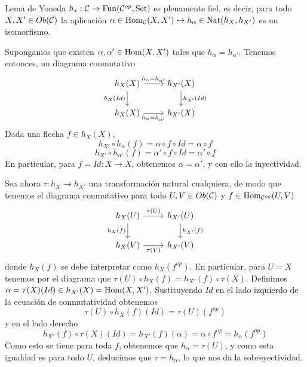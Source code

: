 \documentclass[twoside]{article}
\begin{document}
%
%
\begin{ejercicio}{Lema de Yoneda}
$h_*:{\mathcal C}\to \mathrm{Fun}({\mathcal C}^{op}, \mathrm{Set})$ es plenamente fiel, es decir, para todo $X,X'\in Ob({\mathcal C})$ la aplicación $\alpha\in\operatorname{Hom}_{{\mathcal C}}(X,X')\mapsto h_{\alpha}\in \mathrm{Nat}(h_X,h_{X'})$ es un isomorfismo. 
\end{ejercicio}
\begin{solucion}
Supongamos que existen $\alpha,\alpha'\in\operatorname{Hom}(X,X')$ tales que $h_\alpha=h_{\alpha'}$. Tenemos entonces, un diagrama conmutativo
\[
\begin{tikzcd}
h_X(X)\arrow[r, "h_\alpha=h_{\alpha'}"]\arrow[d, "h_X(Id)"'] & h_{X'}(X)\arrow[d, "h_{X'}(Id)"]\\
h_X(X)\arrow[r, "h_\alpha=h_{\alpha'}"'] & h_{X'}(X)
\end{tikzcd}
\]
Dada una flecha $f\in h_X(X)$, $$h_{X'}\circ h_{\alpha}(f)=\alpha\circ f\circ Id=\alpha\circ f$$
$$h_{X'}\circ h_{\alpha'}(f)=\alpha'\circ f\circ Id=\alpha'\circ f$$
En particular, para $f=Id:X\to X$, obtenemos $\alpha=\alpha'$, y con ello la inyectividad. 

Sea ahora $\tau:h_X\to h_{X'}$ una transformación natural cualquiera, de modo que tenemos el diagrama conmutativo para todo $U,V\in Ob({\mathcal C})$  y $f\in\operatorname{Hom}_{{\mathcal C}^{op}}(U,V)$ 
\[
\begin{tikzcd}
h_X(U)\arrow[r, "\tau(U)"] \arrow[d, "h_X(f)"']& h_{X'}(U)\arrow[d, "h_{X'}(f)"]\\
h_X(V)\arrow[r, "\tau(V)"'] & h_{X'}(V)
\end{tikzcd}
\]
donde $h_X(f)$ se debe interpretar como $h_X(f^{op})$. En particular, para $U=X$ tenemos por el diagrama que $\tau(U)\circ h_X(f)=h_{X'}(f)\circ\tau(X)$. Definimos $\alpha=\tau(X)(Id)\in h_{X'}(X)=\operatorname{Hom}(X,X')$. Sustituyendo $Id$ en el lado izquierdo de la ecuación de conmutatividad obtenemos
\[
\tau(U)\circ h_X(f)(Id)=\tau(U)( f^{op})
\]
y en el lado derecho
\[
h_{X'}(f)\circ\tau(X)(Id)=h_{X'}(f)(\alpha)=\alpha\circ f^{op}=h_\alpha(f^{op})
\]
Como esto se tiene para toda $f$, obtenemos que $h_\alpha=\tau(U)$, y como esta igualdad es para todo $U$, deducimos que $\tau=h_{\alpha}$, lo que nos da la sobreyectividad. 
\end{solucion}
%
%
%
%
\end{document}
